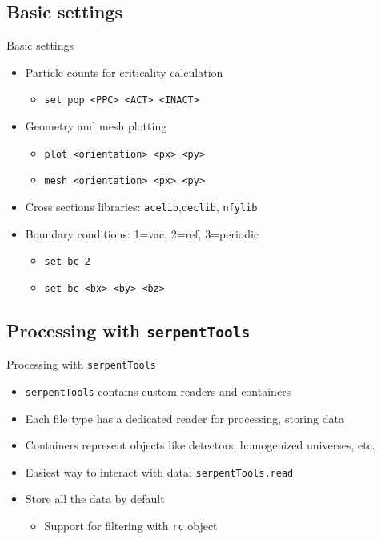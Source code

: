 \documentclass{beamer}
\newcommand{\st}{\texttt{serpentTools} }
\begin{document}
\subsection{Basic settings}

\begin{frame}{Basic settings}
    \begin{itemize}
        \item{Particle counts for criticality calculation}
        \begin{itemize}
            \item{\texttt{set pop <PPC> <ACT> <INACT>}}
        \end{itemize}
        \item{Geometry and mesh plotting}
            \begin{itemize}
                \item{\texttt{plot <orientation> <px> <py>}}
                \item{\texttt{mesh <orientation> <px> <py>}}
            \end{itemize}
        \item{Cross sections libraries: \texttt{acelib},\texttt{declib}, \texttt{nfylib}}
        \item{Boundary conditions: 1=vac, 2=ref, 3=periodic}
            \begin{itemize}
                \item{\texttt{set bc 2}}
                \item{\texttt{set bc <bx> <by> <bz>}}
            \end{itemize}
    \end{itemize}
\end{frame}

\subsection{Processing with \st}

\begin{frame}{Processing with \st}
    \begin{itemize}
        \item{\st contains custom readers and containers}
        \item{Each file type has a dedicated reader for processing, storing data}
        \item{Containers represent objects like detectors, homogenized universes, etc.}
        \item{Easiest way to interact with data: \texttt{serpentTools.read}}
        \item{Store all the data by default}
        \begin{itemize}
            \item{Support for filtering with \texttt{rc} object}
        \end{itemize}
    \end{itemize}
\end{frame}
\end{document}
